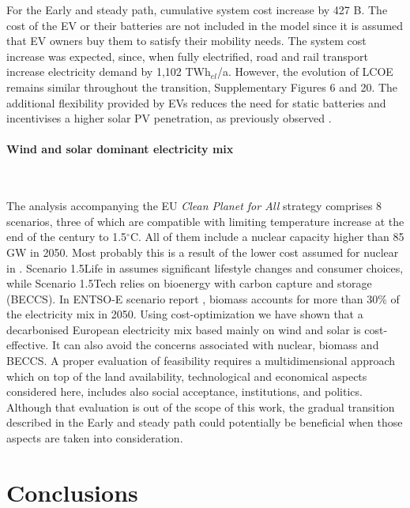 \documentclass[5p]{elsarticle} %
\begin{document}
For the Early and steady path, cumulative system cost increase by 427 B\EUR. The cost of the EV or their batteries are not included in the model since it is assumed that EV owners buy them to satisfy their mobility needs. The system cost increase was expected, since, when fully electrified, road and rail transport increase electricity demand by 1,102 TWh$_{el}$/a. However, the evolution of LCOE remains similar throughout the transition, Supplementary Figures 6 and 20. The additional flexibility provided by EVs reduces the need for static batteries and incentivises a higher solar PV penetration, as previously observed \cite{Brown_2018, Victoria_2019_storage}.

\paragraph{\textbf{Wind and solar dominant electricity mix}} \

The analysis accompanying the EU \textit{Clean Planet for All} strategy \cite{in-depth_2018} comprises 8 scenarios, three of which are compatible with limiting temperature increase at the end of the century to 1.5$^{\circ}$C. All of them include a nuclear capacity higher than 85 GW in 2050. Most probably this is a result of the lower cost assumed for nuclear in \cite{in-depth_2018}. Scenario 1.5Life in \cite{in-depth_2018} assumes significant lifestyle changes and consumer choices, while Scenario 1.5Tech relies on bioenergy with carbon capture and storage (BECCS). 
In ENTSO-E scenario report \cite{TYNDP_scenarios}, biomass accounts for more than 30\% of the electricity mix in 2050. Using cost-optimization we have shown that a decarbonised European electricity mix based mainly on wind and solar is cost-effective.  It can also avoid the concerns associated with nuclear, biomass and BECCS. A proper evaluation of feasibility requires a multidimensional approach which on top of the land availability, technological and economical aspects considered here, includes also social acceptance, institutions, and politics. Although that evaluation is out of the scope of this work, the gradual transition described in the Early and steady path could potentially be beneficial when those aspects are taken into consideration. 




\section{Conclusions} \
\end{document}
